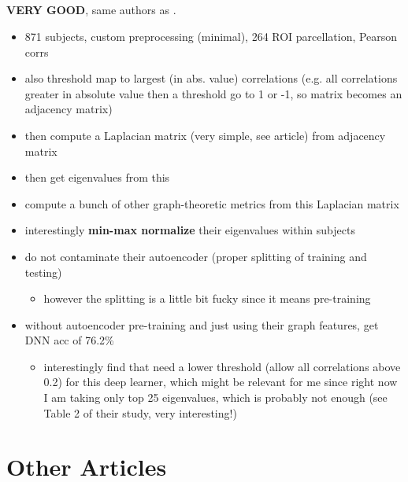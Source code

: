 \documentclass[10pt]{article}
\begin{document}
\subsection{\citet{yinDiagnosisAutismSpectrum2021}}

\textbf{VERY GOOD}, same authors as \citet{mostafaDiagnosisAutismSpectrum2019}.

\begin{itemize}
  \item 871 subjects, custom preprocessing (minimal), 264 ROI parcellation, Pearson corrs
  \item also threshold map to largest (in abs. value) correlations (e.g. all correlations greater in
  absolute value then a threshold go to 1 or -1, so matrix becomes an adjacency matrix)
  \item then compute a Laplacian matrix (very simple, see article) from adjacency matrix
  \item then get eigenvalues from this
  \item compute a bunch of other graph-theoretic metrics from this Laplacian matrix
  \item interestingly \textbf{min-max normalize} their eigenvalues within subjects
  \item do not contaminate their autoencoder (proper splitting of training and testing)
  \begin{itemize}
    \item however the splitting is a little bit fucky since it means pre-training
  \end{itemize}
  \item without autoencoder pre-training and just using their graph features, get DNN acc of 76.2\%
  \begin{itemize}
    \item interestingly find that need a lower threshold (allow all correlations above 0.2) for this
    deep learner, which might be relevant for me since right now I am taking only top 25
    eigenvalues, which is probably not enough (see Table 2 of their study, very interesting!)
  \end{itemize}
\end{itemize}

\section{Other Articles} \label{other-articles}


\subsection{\citet{liMultisiteFMRIAnalysis2020}}
\end{document}

